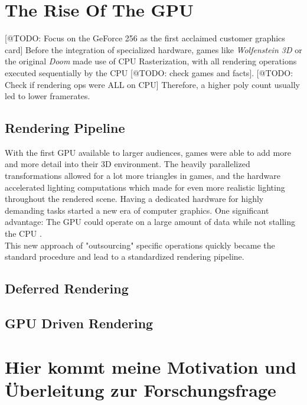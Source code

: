 \section{The Rise Of The GPU}

[@TODO: Focus on the GeForce 256 as the first acclaimed customer graphics card]
Before the integration of specialized hardware, games like \emph{Wolfenstein 3D} or the 
original \emph{Doom} made use of \ac{CPU} Rasterization, with all rendering operations 
executed sequentially by the \ac{CPU} [@TODO: check games and facts].
[@TODO: Check if rendering ops were ALL on CPU] Therefore, a higher poly count usually 
led to lower framerates.

\subsection{Rendering Pipeline}

With the first \ac{GPU} available to larger audiences, games were able to add more and more 
detail into their 3D environment. The heavily parallelized transformations allowed for a lot 
more triangles in games, and the hardware accelerated lighting computations which made for 
even more realistic lighting throughout the rendered scene. Having a dedicated hardware for 
highly demanding tasks started a new era of computer graphics. One significant advantage: 
The \ac{GPU} could operate on a large amount of data while not stalling the \ac{CPU} \cite{Fenno2024}.\\

\noindent 
This new approach of "outsourcing" specific operations quickly became the standard procedure and 
lead to a standardized rendering pipeline. 



\subsection{Deferred Rendering}



\subsection{GPU Driven Rendering}


\section{Hier kommt meine Motivation und Überleitung zur Forschungsfrage}


